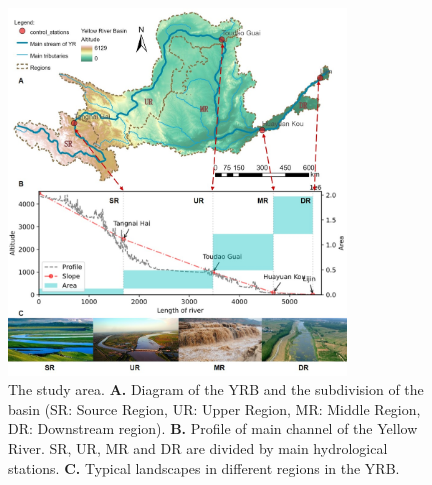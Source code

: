 \documentclass[9pt,twoside,lineno]{pnas-new}
\begin{document}
\begin{figure}
    \centering
    \includegraphics[width=0.8\textwidth]{../../figures/sup/s1_study_area.jpg}
    \caption{
        The study area.
        \textbf{A.} Diagram of the YRB and the subdivision of the basin (SR: Source Region, UR: Upper Region, MR: Middle Region, DR: Downstream region).
        \textbf{B.} Profile of main channel of the Yellow River. SR, UR, MR and DR are divided by main hydrological stations.
        \textbf{C.} Typical landscapes in different regions in the YRB.
    }
\end{figure}
\end{document}

